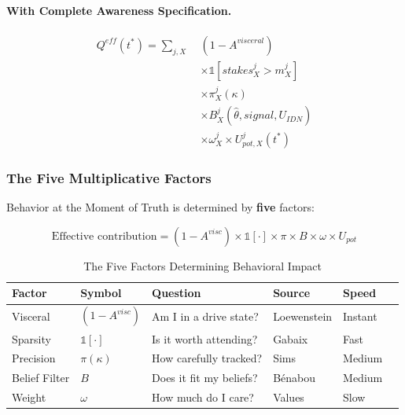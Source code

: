 \paragraph{With Complete Awareness Specification.}

\begin{align}
Q^{eff}(t^*) = \sum_{j, X} \; & (1 - A^{visceral}) \nonumber \\
& \times \mathbb{1}[stakes^j_X > m^j_X] \nonumber \\
& \times \pi^j_X(\kappa) \nonumber \\
& \times B^j_X(\hat{\theta}, signal, U_{IDN}) \nonumber \\
& \times \omega^j_X \times U^j_{pot,X}(t^*)
\label{eq:full-welfare-expanded}
\end{align}

\subsubsection{The Five Multiplicative Factors}
\label{subsubsec:five-factors}

Behavior at the Moment of Truth is determined by \textbf{five} factors:

\begin{equation}
\boxed{\text{Effective contribution} = (1 - A^{visc}) \times \mathbb{1}[\cdot] \times \pi \times B \times \omega \times U_{pot}}
\end{equation}

\begin{table}[htbp]
\centering
\caption{The Five Factors Determining Behavioral Impact}
\label{tab:five-factors}
\renewcommand{\arraystretch}{1.4}
\begin{tabular}{@{}llllll@{}}
\toprule
\textbf{Factor} & \textbf{Symbol} & \textbf{Question} & \textbf{Source} & \textbf{Speed} \\
\midrule
Visceral & $(1-A^{visc})$ & Am I in a drive state? & Loewenstein & Instant \\
Sparsity & $\mathbb{1}[\cdot]$ & Is it worth attending? & Gabaix & Fast \\
Precision & $\pi(\kappa)$ & How carefully tracked? & Sims & Medium \\
Belief Filter & $B$ & Does it fit my beliefs? & Bénabou & Medium \\
Weight & $\omega$ & How much do I care? & Values & Slow \\
\bottomrule
\end{tabular}
\end{table}


